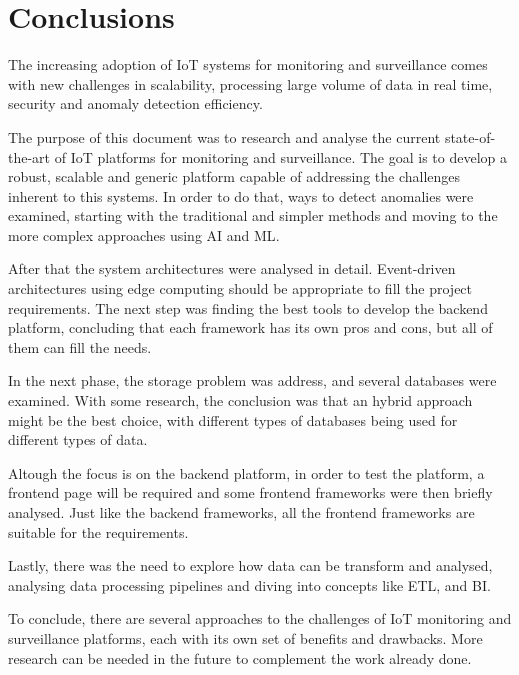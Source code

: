 

\chapter{Conclusions}
\label{cha:conclusions}

The increasing adoption of \gls{IoT} systems for monitoring and surveillance
comes with new challenges in scalability, processing large volume of data in
real time, security and anomaly detection efficiency.

The purpose of this document was to research and analyse the current state-of-the-art
of \gls{IoT} platforms for monitoring and surveillance. The goal is to develop
a robust, scalable and generic platform capable of addressing the challenges
inherent to this systems. In order to do that, ways to detect anomalies were
examined, starting with the traditional and simpler methods and moving to the
more complex approaches using \gls{AI} and \gls{ML}.

After that the system
architectures were analysed in detail. Event-driven architectures using
edge computing should be appropriate to fill the project requirements. The next
step was finding the best tools to develop the backend platform, concluding that
each framework has its own pros and cons, but all of them can fill the needs.

In the next phase, the storage problem was address, and several databases were examined.
With some research, the conclusion was that an hybrid approach might be the best
choice, with different types of databases being used for different types of data.

Altough the focus is on the backend platform, in order to test the platform,
a frontend page will be required and some frontend frameworks were then briefly
analysed. Just like the backend frameworks, all the frontend frameworks are
suitable for the requirements.

Lastly, there was the need to explore how data can be transform and analysed,
analysing data processing pipelines and diving into concepts like \gls{ETL},
and \gls{BI}.

To conclude, there are several approaches to the challenges of \gls{IoT} monitoring
and surveillance platforms, each with its own set of benefits and drawbacks.
More research can be needed in the future to complement the work already done.

